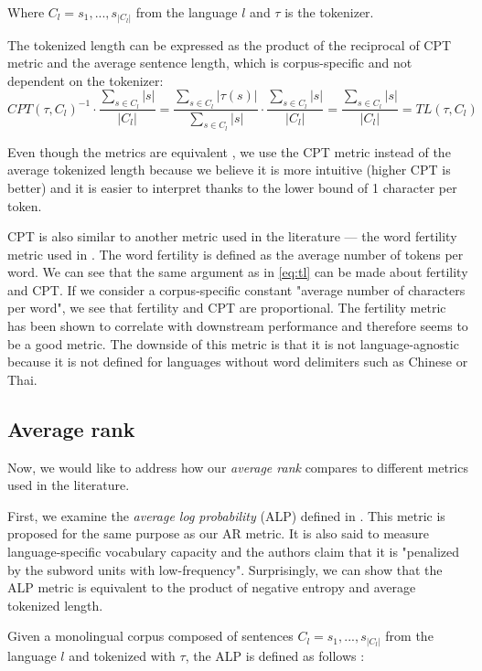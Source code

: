 Where $C_l = {s_1, ..., s_{|C_l|}}$ from the language $l$ and $\tau$ is the tokenizer.

The tokenized length can be expressed as the product of the reciprocal of CPT metric and the average sentence length, which is corpus-specific and not dependent on the tokenizer:
\begin{equation}
\label{eq:tl}
    CPT(\tau, C_l)^{-1} \cdot \frac{\sum_{s \in C_l}|s|}{|C_l|} = \frac{\sum_{s \in C_l}|\tau(s)|}{\sum_{s \in C_l}|s|} \cdot \frac{\sum_{s \in C_l}|s|}{|C_l|} = \frac{\sum_{s \in C_l}|s|}{|C_l|} = TL(\tau, C_l)
\end{equation}

Even though the metrics are equivalent , we use the CPT metric instead of the average tokenized length because we believe it is more intuitive (higher CPT is better) and it is easier to interpret thanks to the lower bound of 1 character per token.

CPT is also similar to another metric used in the literature --- the word fertility metric used in \citet{rust_how_2021}. The word fertility is defined as the average number of tokens per word. We can see that the same argument as in \autoref{eq:tl} can be made about fertility and CPT. If we consider a corpus-specific constant "average number of characters per word", we see that fertility and CPT are proportional. The fertility metric has been shown to correlate with downstream performance and therefore seems to be a good metric. The downside of this metric is that it is not language-agnostic because it is not defined for languages without word delimiters such as Chinese or Thai.

\subsection{Average rank}

Now, we would like to address how our \textit{average rank} compares to different metrics used in the literature. 

First, we examine the \textit{average log probability} (ALP) defined in \citet{zheng_allocating_2021}. This metric is proposed for the same purpose as our AR metric. It is also said to measure language-specific vocabulary capacity and the authors claim that it is "penalized by the subword units with low-frequency". Surprisingly, we can show that the ALP metric is equivalent to the product of negative entropy and average tokenized length.

Given a monolingual corpus composed of sentences $C_l = {s_1, ..., s_{|C_l|}}$ from the language $l$ and tokenized with $\tau$, the ALP is defined as follows \cite{zheng_allocating_2021}:

